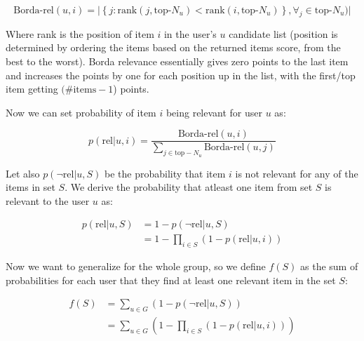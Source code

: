 \begin{equation}
    \textrm{Borda-rel}(u,i) = 
    \big\lvert{
        \left\{j : \textrm{rank}(j, \textrm{top-}N_u) < \textrm{rank}(i, \textrm{top-}N_u) \right\}, \forall_j \in \textrm{top-}N_u)
    }\big\rvert
\end{equation}

Where rank is the position of item $i$ in the user's $u$ candidate list (position is determined by ordering the items based on the returned items score, from the best to the worst). Borda relevance essentially gives zero points to the last item and increases the points by one for each position up in the list, with the first/top item getting $(\#\textrm{items} - 1$) points.

Now we can set probability of item $i$ being relevant for user $u$ as:

\begin{equation}
    p(\textrm{rel}|u, i) = \frac{\textrm{Borda-rel}(u, i)}{\sum_{j \in \textrm{top}-N_u}{\textrm{Borda-rel}(u, j)}}
\end{equation}

Let also $p(\neg\textrm{rel}|u, S)$ be the probability that item $i$ is not relevant for any of the items in set $S$. We derive the probability that atleast one item from set $S$ is relevant to the user $u$ as:

\begin{equation} \label{eq:atleast_one_relevant}
\begin{aligned}
    p(\textrm{rel}|u, S) &= 1 - p(\neg\textrm{rel}|u, S) \\
    & = 1 - \prod_{i \in S}{(1 - p(\textrm{rel}|u, i))}
\end{aligned}
\end{equation}

Now we want to generalize for the whole group, so we define $f(S)$ as the sum of probabilities for each user that they find at least one relevant item in the set $S$:

\begin{equation} \label{eq:relevance_for_set}
\begin{aligned}
    f(S) &= \sum_{u \in G}{\left(1 - p(\neg\textrm{rel}|u, S)\right)} \\
    & = \sum_{u \in G}{\left(1 - \prod_{i \in S}{(1 - p(\textrm{rel}|u, i))}\right)}
\end{aligned}
\end{equation}

